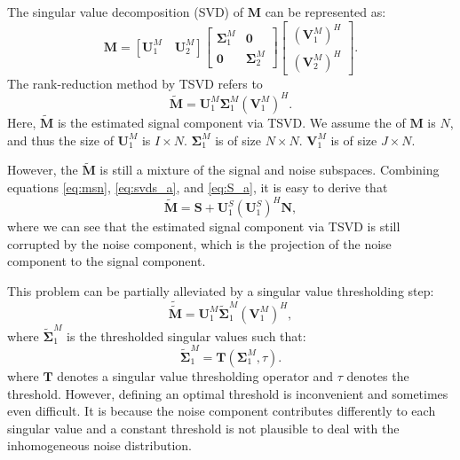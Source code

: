 The singular value decomposition (SVD) of $\mathbf{M}$ can be represented as:
\begin{equation}
\label{eq:svdm_a}
\mathbf{M} = [\mathbf{U}_1^{M}\quad \mathbf{U}_2^{M}]\left[\begin{array}{cc}
\boldsymbol{\Sigma}_1^{M} & \mathbf{0}\\
\mathbf{0} & \boldsymbol{\Sigma}_2^{M}
\end{array}
\right]\left[\begin{array}{c}
(\mathbf{V}_1^{M})^H\\
(\mathbf{V}_2^{M})^H
\end{array}
\right].
\end{equation}
The rank-reduction method by TSVD refers to 
\begin{equation}
\label{eq:M_a}
\tilde{\mathbf{M}}=\mathbf{U}_1^M\boldsymbol{\Sigma}_1^M(\mathbf{V}_1^M)^H.
\end{equation}
Here, $\tilde{\mathbf{M}}$ is the estimated signal component via TSVD. We assume the  of $\mathbf{M}$ is $N$, and thus the size of $\mathbf{U}_1^M$ is $I\times N$. $\boldsymbol{\Sigma}_1^M$ is of size $N\times N$. $\mathbf{V}_1^M$ is of size $J\times N$.


However, the $\tilde{\mathbf{M}}$ is still a mixture of the signal and noise subspaces. Combining equations \ref{eq:msn}, \ref{eq:svds_a}, and \ref{eq:S_a}, it is easy to derive that \cite[]{yangkang2016irr5d}
\begin{equation}
\label{eq:msn2}
\tilde{\mathbf{M}}=\mathbf{S}+\mathbf{U}_1^S(\mathbf{U}_1^S)^H\mathbf{N},
\end{equation}
where we can see that the estimated signal component via TSVD is still corrupted by the noise component, which is the projection of the noise component to the signal component.

This problem can be partially alleviated by a singular value thresholding step:
\begin{equation}
\label{eq:M_a}
\tilde{\tilde{\mathbf{M}}}=\mathbf{U}_1^M\tilde{\boldsymbol{\Sigma}}_1^M(\mathbf{V}_1^M)^H,
\end{equation}
where $\tilde{\boldsymbol{\Sigma}}_1^M$ is the thresholded singular values such that:
\begin{equation}
\label{eq:thr}
\tilde{\boldsymbol{\Sigma}}_1^M = \mathbf{T}(\boldsymbol{\Sigma}_1^M,\tau).
\end{equation}
where $\mathbf{T}$ denotes a singular value thresholding operator and $\tau$ denotes the threshold. However, defining an optimal threshold is inconvenient and sometimes even difficult. It is because the noise component contributes differently to each singular value and a constant threshold is not plausible to deal with the inhomogeneous noise distribution. 

